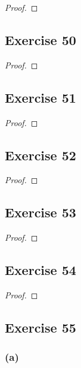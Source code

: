 \documentclass[14pt]{extarticle}
\begin{document}
\begin{proof}

\end{proof}

\subsection{Exercise 50}

\begin{proof}

\end{proof}

\subsection{Exercise 51}

\begin{proof}

\end{proof}

\subsection{Exercise 52}

\begin{proof}

\end{proof}

\subsection{Exercise 53}

\begin{proof}

\end{proof}

\subsection{Exercise 54}

\begin{proof}

\end{proof}

\subsection{Exercise 55}

\subsubsection{(a)}
\end{document}
